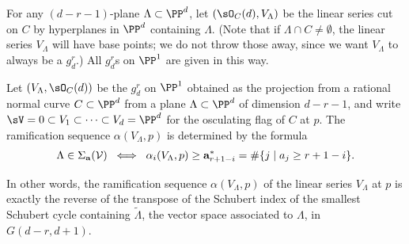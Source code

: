 For any $(d-r-1)$-plane $\Lambda \subset \PP^d$, let $(\sO_C(d), V_\Lambda)$ be the linear series cut on $C$ by hyperplanes in $\PP^d$ containing $\Lambda$. (Note that if $\Lambda \cap C \neq \emptyset$, the linear series $V_\Lambda$ will have base points; we do not throw those away, since we want $V_\Lambda$ to always be a $g^r_d$.) All $g^r_d$s on $\PP^1$ are given in this way.

\begin{proposition}\label{ramification}
Let $(V_\Lambda, \sO_C(d))$ be the $g^r_d$ on $\PP^1$ obtained as the projection from a rational normal curve $C\subset \PP^d$
from a plane $\Lambda \subset \PP^d$ of dimension $d-r-1$, and write $\sV = 0\subset V_1\subset \cdots \subset V_d = \PP^d$ for the osculating flag of $C$ at $p$. The ramification sequence $\alpha(V_\Lambda, p)$
is determined by the formula
%
$$
\Lambda \in \Sigma_{\bf a}({\cal V}) \; \iff \; \alpha_i(V_\Lambda, p) \geq {\bf a}^*_{r+1-i} = \#\{j\mid a_j\geq r+1-i\}.
$$
\end{proposition} 
\def\tL{{\widetilde \Lambda}}
\def\tsV{{\widetilde \sV}}
\def\tV{{\widetilde V}}
In other words, the ramification sequence $\alpha(V_\Lambda, p)$ of the linear series $V_\Lambda$ at $p$ is exactly the reverse of the transpose of the Schubert index of the smallest Schubert cycle containing $\tL$, the vector
space associated to $\Lambda$, in  $G(d-r, d+1)$.

%


